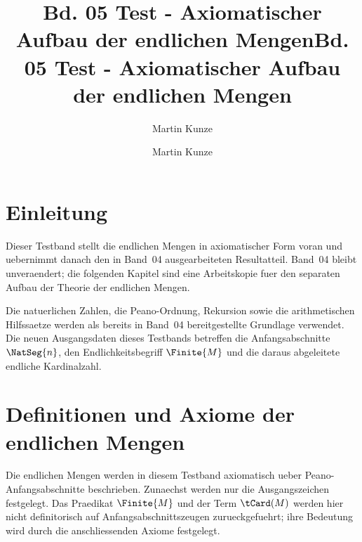 \documentclass[main.tex]{subfiles}
\title{Bd. 05 Test - Axiomatischer Aufbau der endlichen Mengen}
\author{Martin Kunze}
\date{}
\begin{document}
\title{Bd. 05 Test - Axiomatischer Aufbau der endlichen Mengen}
\author{Martin Kunze}
\date{}
\maketitle
\setcounter{tocdepth}{3}
\tableofcontents
\setcounter{file}{5}
\renewcommand{\FormulaBandID}{5}


\chapter{Einleitung}

Dieser Testband stellt die endlichen Mengen in axiomatischer Form voran und
uebernimmt danach den in Band~04 ausgearbeiteten Resultatteil. Band~04 bleibt
unveraendert; die folgenden Kapitel sind eine Arbeitskopie fuer den separaten
Aufbau der Theorie der endlichen Mengen.

Die natuerlichen Zahlen, die Peano-Ordnung, Rekursion sowie die arithmetischen
Hilfssaetze werden als bereits in Band~04 bereitgestellte Grundlage verwendet.
Die neuen Ausgangsdaten dieses Testbands betreffen die Anfangsabschnitte
\(\NatSeg{n}\), den Endlichkeitsbegriff \(\Finite{M}\) und die daraus
abgeleitete endliche Kardinalzahl.

\chapter{Definitionen und Axiome der endlichen Mengen}

Die endlichen Mengen werden in diesem Testband axiomatisch ueber
Peano-Anfangsabschnitte beschrieben. Zunaechst werden nur die
Ausgangszeichen festgelegt. Das Praedikat \(\Finite{M}\) und der Term
\(\tCard(M)\) werden hier nicht definitorisch auf Anfangsabschnittszeugen
zurueckgefuehrt; ihre Bedeutung wird durch die anschliessenden Axiome
festgelegt.
\end{document}
